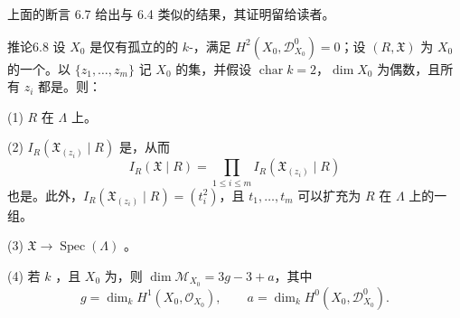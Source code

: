 上面的断言 6.7 给出与 6.4 类似的结果，其证明留给读者。

\begin{SGAresult}{推论}{6.8}
设 $X_0$ 是仅有孤立的的 $k$-，满足 $H^2(X_0,\mathcal D_{X_0}^0)=0$；设 $(R,\mathfrak X)$ 为 $X_0$ 的一个。以 $\{z_1,\ldots,z_m\}$ 记 $X_0$ 的集，并假设 $\operatorname{char}k=2$，$\dim X_0$ 为偶数，且所有 $z_i$ 都是。则：

(1) $R$ 在 $\Lambda$ 上。

(2) $I_R(\mathfrak X_{(z_i)}\mid R)$ 是，从而
\[
I_R(\mathfrak X\mid R)=\prod_{1\leq i\leq m}I_R(\mathfrak X_{(z_i)}\mid R)
\]
也是。此外，$I_R(\mathfrak X_{(z_i)}\mid R)=(t_i^2)$，且 $t_1,\ldots,t_m$ 可以扩充为 $R$ 在 $\Lambda$ 上的一组。

(3) $\mathfrak X\to\operatorname{Spec}(\Lambda)$ 。

(4) 若 $k$ ，且 $X_0$ 为，则 $\dim\mathcal M_{X_0}=3g-3+a$，其中
\[
g=\dim_k H^1(X_0,\mathcal O_{X_0}),\qquad a=\dim_k H^0(X_0,\mathcal D_{X_0}^0).
\]
\end{SGAresult}
